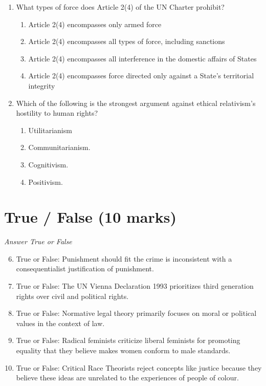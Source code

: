 \documentclass[12pt]{article}
\begin{document}
\begin{enumerate}[label=\arabic*.]
\begin{enumerate}[label=(\alph*)]
\end{enumerate}
\item What types of force does Article 2(4) of the UN Charter prohibit?
\begin{enumerate}[label=(\alph*)]
    \item Article 2(4) encompasses only armed force
    \item Article 2(4) encompasses all types of force, including sanctions
    \item Article 2(4) encompasses all interference in the domestic affairs of States
    \item Article 2(4) encompasses force directed only against a State's territorial integrity
\end{enumerate}
\item Which of the following is the strongest argument against ethical relativism's hostility to human rights?
\begin{enumerate}[label=(\alph*)]
    \item Utilitarianism
    \item Communitarianism.
    \item Cognitivism.
    \item Positivism.
\end{enumerate}
\end{enumerate}

\section*{True / False (10 marks)}
\textit{Answer True or False}
\begin{enumerate}[label=\arabic*.]
\setcounter{enumi}{5}
\item True or False: Punishment should fit the crime is inconsistent with a consequentialist justification of punishment.
\item True or False: The UN Vienna Declaration 1993 prioritizes third generation rights over civil and political rights.
\item True or False: Normative legal theory primarily focuses on moral or political values in the context of law.
\item True or False: Radical feminists criticize liberal feminists for promoting equality that they believe makes women conform to male standards.
\item True or False: Critical Race Theorists reject concepts like justice because they believe these ideas are unrelated to the experiences of people of colour.
\end{enumerate}
\end{document}
